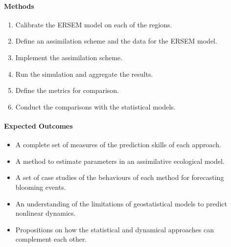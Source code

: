 \paragraph{Methods}

\begin{enumerate}

\item Calibrate the ERSEM model on each of the regions.

\item Define an assimilation scheme and the data for the ERSEM model.

\item Implement the assimilation scheme.

\item Run the simulation and aggregate the results.

\item Define the metrics for comparison.

\item Conduct the comparisons with the statistical models.

\end{enumerate}

\paragraph{Expected Outcomes}

\begin{itemize}

\item A complete set of measures of the prediction skills of each approach.

\item A method to estimate parameters in an assimilative ecological model.

\item A set of case studies of the behaviours of each method for forecasting
blooming events.

\item An understanding of the limitations of geostatistical models to predict
nonlinear dynamics. 

\item Propositions on how the statistical and dynamical approaches can
complement each other.

\end{itemize}

